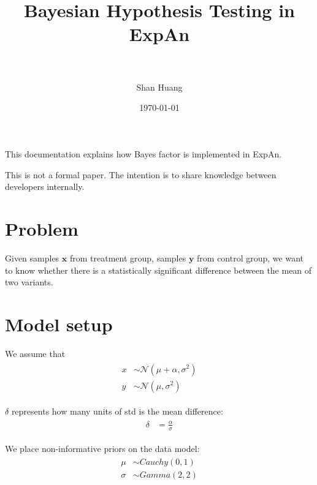 \documentclass[paper=a4, fontsize=11pt]{scrartcl} %
\title{	
\normalfont \normalsize 
\textsc{} \\ [25pt] %
\horrule{0.5pt} \\[0.4cm] %
\huge Bayesian Hypothesis Testing in ExpAn  \\ %
\horrule{2pt} \\[0.5cm] %
}
\author{Shan Huang} %
\date{\normalsize\today} %
\numberwithin{equation}{section} %
\numberwithin{figure}{section} %
\numberwithin{table}{section} %
\begin{document}
\maketitle %


This documentation explains how Bayes factor is implemented in ExpAn. 

This is not a formal paper. The intention is to share knowledge between developers internally. 

\section{Problem}
Given samples $\textbf{x}$ from treatment group, samples $\textbf{y}$ from control group, we want to know whether there is a statistically significant difference between the mean of two variants.


\section{ Model setup}

We assume that
\begin{align} 
\begin{split}
x &\sim \mathcal{N}(\mu + \alpha, \sigma^2)\\
y &\sim \mathcal{N}(\mu, \sigma^2)
\end{split}					
\end{align}

$\delta$ represents how many units of std is the mean difference:
\begin{align}
\begin{split}
\delta  &= \frac{\alpha}{ \sigma}
\end{split}					
\end{align}
 
We place non-informative priors on the data model:
\begin{align}
\begin{split}
\mu &\sim \mathit{Cauchy} (0, 1) \\
\sigma &\sim \mathit{Gamma} (2, 2)
\end{split}
\end{align}
\end{document}
